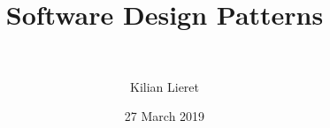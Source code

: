 %
\title{Software Design Patterns}
\subtitle{\ \relax}
\author{Kilian Lieret}
\newcommand*{\coauthors}{}
\date{27 March 2019}
%
%
%
